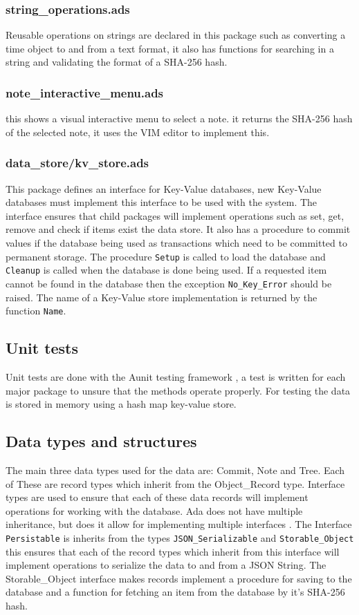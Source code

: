 \documentclass[12pt,a4paper]{article}
\newcommand{\codetext}[1]{\colorbox{light-gray}{\texttt{#1}}}
\begin{document}
\subsubsection{string\_operations.ads}
Reusable operations on strings are declared in this package such as converting a
time object to and from a text format, it also has functions for searching in a
string and validating the format of a SHA-256 hash.

\subsubsection{note\_interactive\_menu.ads}
this shows a visual interactive menu to select a note. it returns the SHA-256
hash of the selected note, it uses the VIM editor to implement this.

\subsubsection{data\_store/kv\_store.ads}
This package defines an interface for
Key-Value databases, new Key-Value databases must implement this interface to be
used with the system. The interface ensures that child packages will implement
operations such as set, get, remove and check if items exist the data store. It
also has a procedure to commit values if the database being used as transactions
which need to be committed to permanent storage. The procedure \codetext{Setup}
is called to load the database and \codetext{Cleanup} is called when the
database is done being used. If a requested item cannot be found in the database
then the exception \codetext{No\_Key\_Error} should be raised. The name of a
Key-Value store implementation is returned by the function \codetext{Name}.

\subsection{Unit tests}
Unit tests are done with the Aunit testing framework
\cite{Aunit},  a test is written for each major package to unsure that the
methods operate properly. For testing the data is stored in memory using a hash
map key-value store.

\subsection{Data types and structures}
The main three data types used for the
data are: Commit, Note and Tree. Each of These are record types which inherit
from the Object\_Record type. Interface types are used to ensure that each of
these data records will implement operations for working with the database. Ada
does not have multiple inheritance, but does it allow for implementing multiple
interfaces  \cite{Ada-Interface-Types}. The Interface \codetext{Persistable} is
inherits from the types \codetext{JSON\_Serializable} and
\codetext{Storable\_Object} this ensures that each of the record types which
inherit from this interface will implement operations to serialize the data to
and from a JSON \cite{rfc7159} String. The Storable\_Object interface makes
records implement a procedure for saving to the database and a function for
fetching an item from the database by it's SHA-256 hash. 
\end{document}
